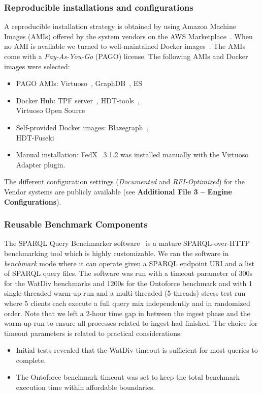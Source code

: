\documentclass[twocolumn]{bmcart}%
\begin{document}
\subsubsection{Reproducible installations and configurations}

A reproducible installation strategy is obtained by using Amazon Machine Images (AMIs) offered by the system vendors on the AWS Marketplace~\cite{awsmarketplace}. When no AMI is available we turned to well-maintained Docker images~\cite{dockerhub}.
The AMIs come with a \emph{Pay-As-You-Go} (PAGO) license.
The following AMIs and Docker images were selected:

\begin{itemize}
	\item PAGO AMIs: Virtuoso~\cite{Virtuoso}, GraphDB~\cite{graphdb}, ES
	\item Docker Hub: TPF server~\cite{dockerhubldfserver}, HDT-tools~\cite{hdtcpp}, \\ Virtuoso Open Source~\cite{virtuosoos} 
	\item Self-provided Docker images: Blazegraph~\cite{dockerblazegraph}, \\ HDT-Fuseki~\cite{hdtfuseki} 
	\item Manual installation: FedX~\cite{saleem2016fine} 3.1.2 was installed manually with the Virtuoso Adapter plugin. %
\end{itemize}

The different configuration settings (\emph{Documented} and \emph{RFI-Optimized}) for the Vendor systems are publicly available (see \textbf{Additional File 3 -- Engine Configurations}).




\subsubsection{Reusable Benchmark Components}
The SPARQL Query Benchmarker software~\cite{sparqlquerybm} is a mature SPARQL-over-HTTP benchmarking tool which is highly customizable. We ran the software in \emph{benchmark} mode where it can operate given a SPARQL endpoint URI and a list of SPARQL query files. The software was run with a timeout parameter of 300s for the WatDiv benchmarks and 1200s for the Ontoforce benchmark and with 1 single-threaded warm-up run and a multi-threaded (5 threads) stress test run where 5 clients each execute a full query mix independently and in randomized order. Note that we left a 2-hour time gap in between the ingest phase and the warm-up run to ensure all processes related to ingest had finished.
The choice for timeout parameters is related to practical considerations: 
\begin{itemize}
	\item Initial tests revealed that the WatDiv timeout is sufficient for most queries to complete.
	\item The Ontoforce benchmark timeout was set to keep the total benchmark execution time within affordable boundaries.
\end{itemize} 
\end{document}
